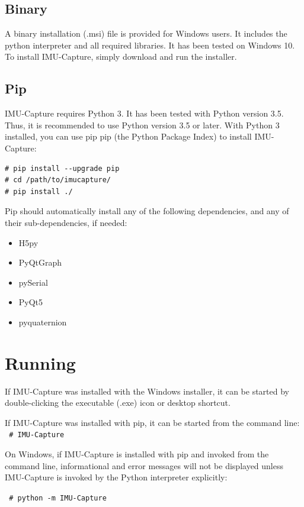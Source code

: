 \documentclass[11pt,letterpaper,article,oneside]{memoir}
\newcommand{\name}{IMU-Capture}
\begin{document}
\section{Binary}

A binary installation (.msi) file is provided for Windows users. It includes the
python interpreter and all required libraries. It has been tested on Windows 10.
To install \name{}, simply download and run the installer.

\section{Pip}

\name{} requires Python 3. It has been tested with Python version 3.5. Thus, it
is recommended to use Python version 3.5 or later.  With Python 3 installed, you
can use pip pip (the Python Package Index) to install \name{}:

\begin{verbatim}
# pip install --upgrade pip
# cd /path/to/imucapture/
# pip install ./
\end{verbatim}


Pip should automatically install any of the following dependencies, and any of their sub-dependencies, if needed:
\begin{itemize}
\item H5py
\item PyQtGraph
\item pySerial
\item PyQt5
\item pyquaternion
\end{itemize}


\chapter{Running}

If \name{} was installed with the Windows installer, it can be started by double-clicking the
executable (.exe) icon or desktop shortcut.

If \name{} was installed with pip, it can be started from the command line:\\

\texttt{
\# \name{}
}

On Windows, if \name{} is installed with pip and invoked from the command line,
informational and error messages will not be displayed unless \name{} is invoked
by the Python interpreter explicitly:

\texttt{
\# python -m \name{}
}
\end{document}
